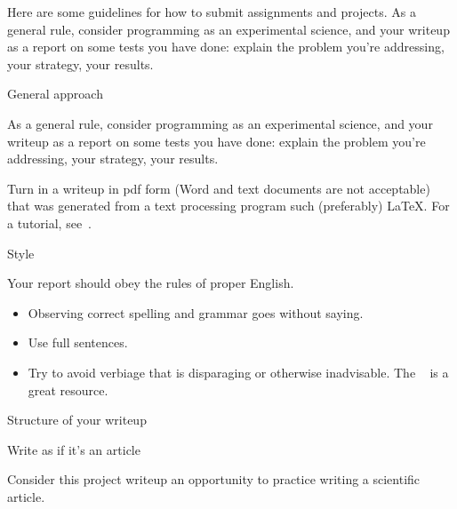 

Here are some guidelines for how to submit assignments and projects.
As a general rule, consider programming as an experimental science,
and your writeup as a report on some tests you have done: explain
the problem you're addressing, your strategy, your results.

 {General approach}

As a general rule, consider programming as an experimental science,
and your writeup as a report on some tests you have done: explain
the problem you're addressing, your strategy, your results.

Turn in a writeup in pdf form (Word and text documents are not acceptable)
that was generated from a text processing program such 
(preferably) \LaTeX.
For a tutorial, see~.

 {Style}

Your report should obey the rules of proper English.
\begin{itemize}
\item Observing correct spelling and grammar goes without saying.
\item Use full sentences.
\item Try to avoid verbiage that is disparaging
  or otherwise inadvisable.
  The
  ~\cite{googlestyle}
  is a great resource.
\end{itemize}

 {Structure of your writeup}

 {Write as if it's an article}

Consider this project writeup an opportunity to practice writing a scientific article.

